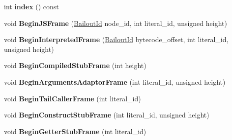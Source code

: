 \begin{DoxyCompactItemize}
\item 
int {\bfseries index} () const \hypertarget{classv8_1_1internal_1_1_b_a_s_e___e_m_b_e_d_d_e_d_afa9166c3764bf180c48f1675f261f3a7}{}\label{classv8_1_1internal_1_1_b_a_s_e___e_m_b_e_d_d_e_d_afa9166c3764bf180c48f1675f261f3a7}

\item 
void {\bfseries Begin\+J\+S\+Frame} (\hyperlink{classv8_1_1internal_1_1_bailout_id}{Bailout\+Id} node\+\_\+id, int literal\+\_\+id, unsigned height)\hypertarget{classv8_1_1internal_1_1_b_a_s_e___e_m_b_e_d_d_e_d_a00bc633eb40f63d64e9604643019b86f}{}\label{classv8_1_1internal_1_1_b_a_s_e___e_m_b_e_d_d_e_d_a00bc633eb40f63d64e9604643019b86f}

\item 
void {\bfseries Begin\+Interpreted\+Frame} (\hyperlink{classv8_1_1internal_1_1_bailout_id}{Bailout\+Id} bytecode\+\_\+offset, int literal\+\_\+id, unsigned height)\hypertarget{classv8_1_1internal_1_1_b_a_s_e___e_m_b_e_d_d_e_d_a082c4d0705e86df60889afba0d9b480b}{}\label{classv8_1_1internal_1_1_b_a_s_e___e_m_b_e_d_d_e_d_a082c4d0705e86df60889afba0d9b480b}

\item 
void {\bfseries Begin\+Compiled\+Stub\+Frame} (int height)\hypertarget{classv8_1_1internal_1_1_b_a_s_e___e_m_b_e_d_d_e_d_a8b2ce920d5dc9024f616dcc953bbfb03}{}\label{classv8_1_1internal_1_1_b_a_s_e___e_m_b_e_d_d_e_d_a8b2ce920d5dc9024f616dcc953bbfb03}

\item 
void {\bfseries Begin\+Arguments\+Adaptor\+Frame} (int literal\+\_\+id, unsigned height)\hypertarget{classv8_1_1internal_1_1_b_a_s_e___e_m_b_e_d_d_e_d_adabf514243644e4c397b134da81dc20d}{}\label{classv8_1_1internal_1_1_b_a_s_e___e_m_b_e_d_d_e_d_adabf514243644e4c397b134da81dc20d}

\item 
void {\bfseries Begin\+Tail\+Caller\+Frame} (int literal\+\_\+id)\hypertarget{classv8_1_1internal_1_1_b_a_s_e___e_m_b_e_d_d_e_d_a5f82d37ec47378b00116a0add7b4f0d9}{}\label{classv8_1_1internal_1_1_b_a_s_e___e_m_b_e_d_d_e_d_a5f82d37ec47378b00116a0add7b4f0d9}

\item 
void {\bfseries Begin\+Construct\+Stub\+Frame} (int literal\+\_\+id, unsigned height)\hypertarget{classv8_1_1internal_1_1_b_a_s_e___e_m_b_e_d_d_e_d_a905f69186c3df7de1dc5f4f868b66018}{}\label{classv8_1_1internal_1_1_b_a_s_e___e_m_b_e_d_d_e_d_a905f69186c3df7de1dc5f4f868b66018}

\item 
void {\bfseries Begin\+Getter\+Stub\+Frame} (int literal\+\_\+id)\hypertarget{classv8_1_1internal_1_1_b_a_s_e___e_m_b_e_d_d_e_d_a4032a61ee54d10d693315b4b563e187a}{}\label{classv8_1_1internal_1_1_b_a_s_e___e_m_b_e_d_d_e_d_a4032a61ee54d10d693315b4b563e187a}


\end{DoxyCompactItemize}
